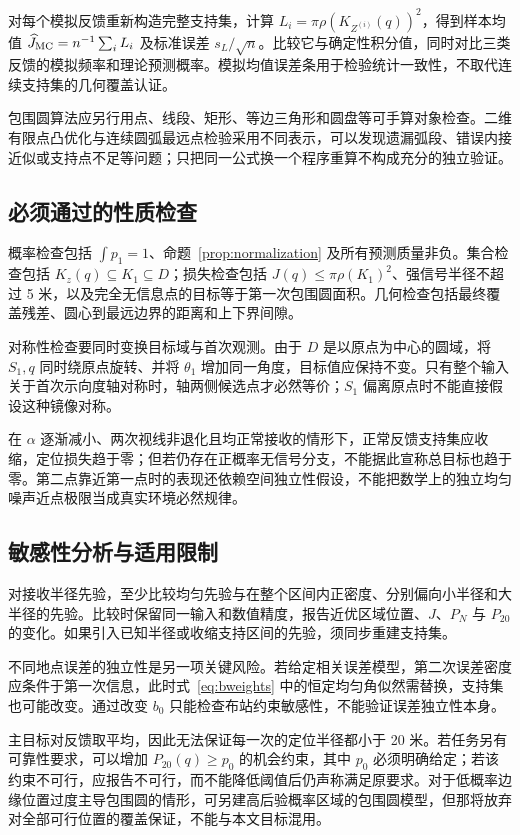 \documentclass[UTF8,a4paper,zihao=-4,fontset=none]{ctexart}
\numberwithin{equation}{section}
\theoremstyle{definition}
\begin{document}
对每个模拟反馈重新构造完整支持集，计算 \(L_i=\pi\rho(K_{Z^{(i)}}(q))^2\)，得到样本均值 \(\widehat J_{\rm MC}=n^{-1}\sum_iL_i\) 及标准误差 \(s_L/\sqrt n\)。比较它与确定性积分值，同时对比三类反馈的模拟频率和理论预测概率。模拟均值误差条用于检验统计一致性，不取代连续支持集的几何覆盖认证。

包围圆算法应另行用点、线段、矩形、等边三角形和圆盘等可手算对象检查。二维有限点凸优化与连续圆弧最远点检验采用不同表示，可以发现遗漏弧段、错误内接近似或支持点不足等问题；只把同一公式换一个程序重算不构成充分的独立验证。

\subsection{必须通过的性质检查}
概率检查包括 \(\int p_1=1\)、命题~\ref{prop:normalization} 及所有预测质量非负。集合检查包括 \(K_z(q)\subseteq K_1\subseteq D\)；损失检查包括 \(J(q)\le\pi\rho(K_1)^2\)、强信号半径不超过 5 米，以及完全无信息点的目标等于第一次包围圆面积。几何检查包括最终覆盖残差、圆心到最远边界的距离和上下界间隙。

对称性检查要同时变换目标域与首次观测。由于 \(D\) 是以原点为中心的圆域，将 \(S_1,q\) 同时绕原点旋转、并将 \(\theta_1\) 增加同一角度，目标值应保持不变。只有整个输入关于首次示向度轴对称时，轴两侧候选点才必然等价；\(S_1\) 偏离原点时不能直接假设这种镜像对称。

在 \(\alpha\) 逐渐减小、两次视线非退化且均正常接收的情形下，正常反馈支持集应收缩，定位损失趋于零；但若仍存在正概率无信号分支，不能据此宣称总目标也趋于零。第二点靠近第一点时的表现还依赖空间独立性假设，不能把数学上的独立均匀噪声近点极限当成真实环境必然规律。

\subsection{敏感性分析与适用限制}
对接收半径先验，至少比较均匀先验与在整个区间内正密度、分别偏向小半径和大半径的先验。比较时保留同一输入和数值精度，报告近优区域位置、\(J\)、\(P_N\) 与 \(P_{20}\) 的变化。如果引入已知半径或收缩支持区间的先验，须同步重建支持集。

不同地点误差的独立性是另一项关键风险。若给定相关误差模型，第二次误差密度应条件于第一次信息，此时式~\eqref{eq:bweights} 中的恒定均匀角似然需替换，支持集也可能改变。通过改变 \(b_0\) 只能检查布站约束敏感性，不能验证误差独立性本身。

主目标对反馈取平均，因此无法保证每一次的定位半径都小于 20 米。若任务另有可靠性要求，可以增加 \(P_{20}(q)\ge p_0\) 的机会约束，其中 \(p_0\) 必须明确给定；若该约束不可行，应报告不可行，而不能降低阈值后仍声称满足原要求。对于低概率边缘位置过度主导包围圆的情形，可另建高后验概率区域的包围圆模型，但那将放弃对全部可行位置的覆盖保证，不能与本文目标混用。
\end{document}
